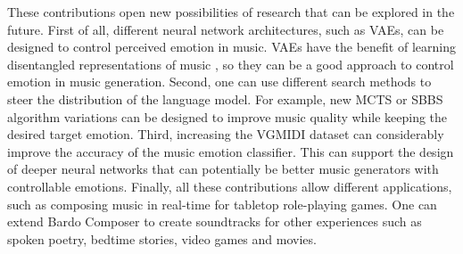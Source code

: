 These contributions open new possibilities of research that can be explored in the future. First of all, different neural network architectures, such as VAEs, can be designed to control perceived emotion in music. VAEs have the benefit of learning disentangled representations of music \cite{yang2019deep}, so they can be a good approach to control emotion in music generation. Second, one can use different search methods to steer the distribution of the language model. For example, new MCTS or SBBS algorithm variations can be designed to improve music quality while keeping the desired target emotion. Third, increasing the VGMIDI dataset can considerably improve the accuracy of the music emotion classifier. This can support the design of deeper neural networks that can potentially be better music generators with controllable emotions. Finally, all these contributions allow different applications, such as composing music in real-time for tabletop role-playing games. One can extend Bardo Composer to create soundtracks for other experiences such as spoken poetry, bedtime stories, video games and movies.

